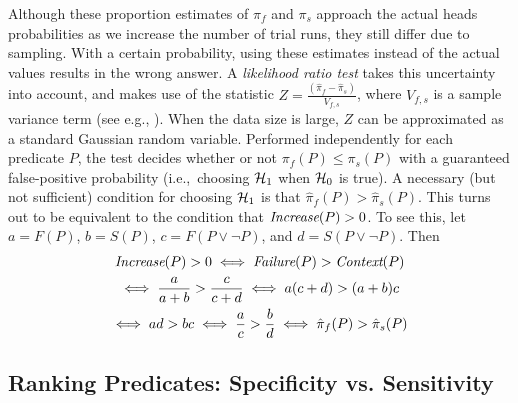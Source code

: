 Although these proportion estimates of $\pi_f$ and $\pi_s$ approach the
actual heads probabilities as we increase the number of trial runs, they
still differ due to sampling.  With a certain probability, using these
estimates instead of the actual values results in the wrong
answer.  A \textit{likelihood ratio test} takes this uncertainty into
account, and makes use of the statistic $ Z = \frac{(\hat \pi_f - \hat
  \pi_s)}{V_{f,s}}$, where $V_{f,s}$ is a sample variance term (see
e.g., \cite{Lehmann:1986:hyptest}).  When
the data size is large, $Z$ can be approximated as a standard Gaussian
random variable.  Performed independently for each predicate $P$, the
test decides whether or not $\pi_f(P) \leq \pi_s(P)$ with a guaranteed
false-positive probability (i.e.,\ choosing ${\mathcal{H}}_1$ when ${\mathcal{H}}_0$ is true).
A necessary (but not sufficient) condition for choosing ${\mathcal{H}}_1$ is that
$\hat \pi_f(P) > \hat \pi_s(P)$.  This turns out to be
equivalent to the condition that $\textit{Increase}(P) > 0$.  To see this,
let $a = F(P)$, $b = S(P)$, $c = F(P\lor\lnot P)$, and $d = S(P\lor\lnot P)$.
Then
\begin{gather*}
  \textit{Increase}(P) > 0 \iff \textit{Failure}(P) > \textit{Context}(P) \\
  \iff \frac{a}{a+b} > \frac{c}{c+d}
  \iff a (c+d) > (a+b) c \\
  \iff ad > bc \iff \frac{a}{c} > \frac{b}{d}
  \iff \hat \pi_f(P) > \hat \pi_s(P)
\end{gather*}





\subsection{Ranking Predicates: Specificity vs. Sensitivity}
\label{sec:ranking}


